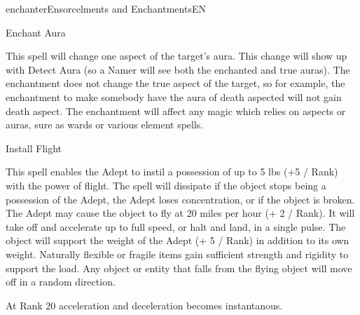 \documentclass[a4paper]{article}
\begin{document}
\begin{college}[1.1]{enchanter}{Ensorcelments and Enchantments}{EN}


\begin{spell}[S-20]{Enchant Aura}

\begin{effects}
This spell will change one aspect of the target's aura.  This change
will show up with Detect Aura (so a Namer will see both the enchanted
and true auras).  The enchantment does not change the true aspect of
the target, so for example, the enchantment to make somebody have the
aura of death aspected will not gain death aspect.  The enchantment
will affect any magic which relies on aspects or auras, sure as wards
or various element spells.
\end{effects}
\end{spell}

\begin{spell}[S-21]{Install Flight}

\begin{effects}
This spell enables the Adept to instil a possession of up to 5 lbs (+5
/ Rank) with the power of flight. The spell will dissipate if the
object stops being a possession of the Adept, the Adept loses
concentration, or if the object is broken. The Adept may cause the
object to fly at 20 miles per hour (+ 2 / Rank). It will take off and
accelerate up to full speed, or halt and land, in a single pulse. The
object will support the weight of the Adept (+ 5 / Rank) in addition
to its own weight. Naturally flexible or fragile items gain sufficient
strength and rigidity to support the load. Any object or entity that
falls from the flying object will move off in a random direction.

At Rank 20 acceleration and deceleration becomes instantanous.
\end{effects}
\end{spell}

\end{college}
\end{document}
